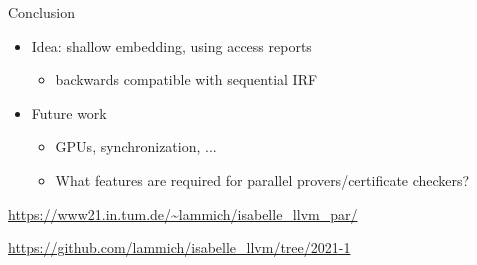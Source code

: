 \documentclass[fleqn]{beamer}
\begin{document}
{\begin{frame}{Conclusion}
\begin{itemize}
\begin{itemize}
    \end{itemize}
   \item Idea: shallow embedding, using access reports
    \begin{itemize}
     \item backwards compatible with sequential IRF

    \end{itemize}
   \item Future work
    \begin{itemize}
     \item GPUs, synchronization, ...

     \item What features are required for parallel provers/certificate checkers?

    \end{itemize}
  \end{itemize}
  \vfill
  \url{https://www21.in.tum.de/~lammich/isabelle_llvm_par/}

  \url{https://github.com/lammich/isabelle_llvm/tree/2021-1}


\end{frame}
}



\end{document}
